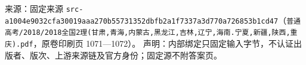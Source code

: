 
\begin{gktip}
来源：固定来源 \texttt{src-a1004e9032cfa30019aaa270b55731352dbfb2a1f7337a3d770a726853b1cd47}（\texttt{普通高考/2018/2018全国2理(甘肃,青海,内蒙古,黑龙江,吉林,辽宁,海南.宁夏,新疆,陕西,重庆).pdf}，原卷印刷页 1071—1072）。
声明：内部绑定只固定输入字节，不认证出版者、版次、上游来源链及官方身份；固定源不附答案页。
\end{gktip}

\par\medskip


